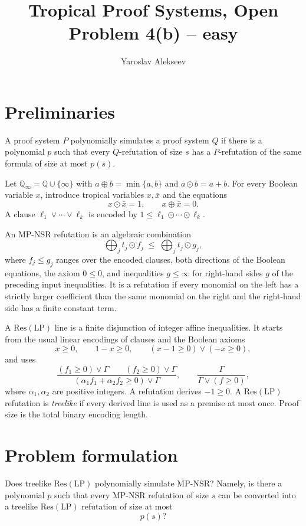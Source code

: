 \documentclass[10pt]{article}
\title{Tropical Proof Systems, Open Problem 4(b) -- easy}
\author{Yaroslav Alekseev}
\date{}
\newcommand{\Qinf}{\mathbb{Q}_{\infty}}
\newcommand{\MPNSR}{\mathrm{MP\text{-}NSR}}
\newcommand{\ResLP}{\mathrm{Res}(\mathrm{LP})}
\begin{document}
\maketitle

\section{Preliminaries}

A proof system $P$ polynomially simulates a proof system $Q$ if there is a
polynomial $p$ such that every $Q$-refutation of size $s$ has a
$P$-refutation of the same formula of size at most $p(s)$.

Let $\Qinf=\mathbb{Q}\cup\{\infty\}$ with
$a\oplus b=\min\{a,b\}$ and $a\odot b=a+b$.
For every Boolean variable $x$, introduce tropical variables $x,\bar x$ and
the equations
\[
 x\odot\bar x=1,
 \qquad
 x\oplus\bar x=0.
\]
A clause $\ell_1\vee\cdots\vee\ell_k$ is encoded by
$1\leq\ell_1\odot\cdots\odot\ell_k$.

An $\MPNSR$ refutation is an algebraic combination
\[
 \bigoplus_j t_j\odot f_j
 \;\leq\;
 \bigoplus_j t_j\odot g_j,
\]
where $f_j\leq g_j$ ranges over the encoded clauses, both directions of the
Boolean equations, the axiom $0\leq0$, and inequalities $g\leq\infty$ for
right-hand sides $g$ of the preceding input inequalities.  It is a refutation
if every monomial on the left has a strictly larger
coefficient than the same monomial on the right and the right-hand side has a
finite constant term.

A $\ResLP$ line is a finite disjunction of integer affine inequalities.  It
starts from the usual linear encodings of clauses and the Boolean axioms
\[
 x\geq0,
 \qquad
 1-x\geq0,
 \qquad
 (x-1\geq0)\vee(-x\geq0),
\]
and uses
\[
\frac{(f_1\geq0)\vee\Gamma\qquad(f_2\geq0)\vee\Gamma}
     {(\alpha_1f_1+\alpha_2f_2\geq0)\vee\Gamma},
\qquad
\frac{\Gamma}{\Gamma\vee(f\geq0)},
\]
where $\alpha_1,\alpha_2$ are positive integers.  A refutation derives
$-1\geq0$.
A $\ResLP$ refutation is \emph{treelike} if every derived line is used as a
premise at most once.
Proof size is the total binary encoding length.

\section{Problem formulation}

Does treelike $\ResLP$ polynomially simulate $\MPNSR$?  Namely, is there a
polynomial $p$ such that every $\MPNSR$ refutation of size $s$ can be
converted into a treelike $\ResLP$ refutation of size at most
\[
 p(s)?
\]
\end{document}
